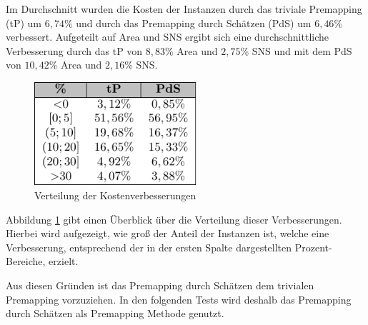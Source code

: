 \documentclass[11pt, a4paper, german]{article}
\begin{document}
Im Durchschnitt wurden die Kosten der Instanzen durch das triviale Premapping (tP) um $6,74$\% und durch das Premapping durch Sch\"atzen (PdS) um $6,46$\% verbessert. Aufgeteilt auf Area und SNS ergibt sich eine durchschnittliche Verbesserung durch das tP von $8,83$\% Area und $2,75 $\% SNS und mit dem PdS von $10,42$\% Area und $2,16$\% SNS.\\
\begin{figure}
		\includegraphics[width = 6cm]{pictures/tex_files/analysis/premapping_table}
		\caption{Verteilung der Kostenverbesserungen}
		\label{bild:premapping_table}
\end{figure}
Abbildung \ref{bild:premapping_table} gibt einen \"Uberblick \"uber die Verteilung dieser Verbesserungen. Hierbei wird aufgezeigt, wie gro{\ss} der Anteil der Instanzen ist, welche
eine Verbesserung, entsprechend der in der ersten Spalte dargestellten Prozent-Bereiche, erzielt.

Aus diesen Gr\"unden ist das Premapping durch Sch\"atzen dem trivialen Premapping vorzuziehen. In den folgenden Tests wird deshalb das Premapping durch Sch\"atzen als Premapping Methode genutzt.
\end{document}

